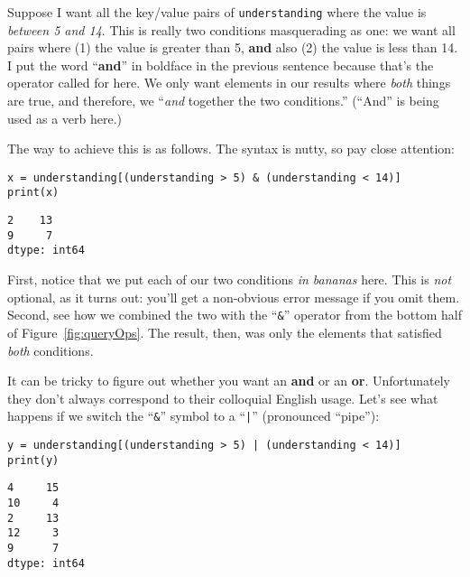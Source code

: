 
Suppose I want all the key/value pairs of \texttt{understanding} where the
value is \textit{between 5 and 14}. This is really two conditions masquerading
as one: we want all pairs where (1) the value is greater than 5, \textbf{and}
also (2) the value is less than 14. I put the word ``\textbf{and}'' in boldface
in the previous sentence because that's the operator called for here. We only
want elements in our results where \textit{both} things are true, and
therefore, we ``\textit{and} together the two conditions.'' (``And'' is being
used as a verb here.)

The way to achieve this is as follows. The syntax is nutty, so pay close
attention:

\begin{Verbatim}[fontsize=\footnotesize,samepage=true,frame=single,framesep=3mm]
x = understanding[(understanding > 5) & (understanding < 14)]
print(x)
\end{Verbatim}

\begin{Verbatim}[fontsize=\small,samepage=true,frame=leftline,framesep=5mm,framerule=1mm]
2    13
9     7
dtype: int64
\end{Verbatim}

First, notice that we put each of our two conditions \textit{in bananas} here.
This is \textit{not} optional, as it turns out: you'll get a non-obvious error
message if you omit them. Second, see how we combined the two with the
``\texttt{\&}'' operator from the bottom half of Figure~\ref{fig:queryOps}. The
result, then, was only the elements that satisfied \textit{both} conditions.


It can be tricky to figure out whether you want an \textbf{and} or an
\textbf{or}. Unfortunately they don't always correspond to their colloquial
English usage. Let's see what happens if we switch the ``\texttt{\&}'' symbol to
a ``\texttt{|}'' (pronounced ``pipe''):

\begin{Verbatim}[fontsize=\footnotesize,samepage=true,frame=single,framesep=3mm]
y = understanding[(understanding > 5) | (understanding < 14)]
print(y)
\end{Verbatim}

\begin{Verbatim}[fontsize=\small,samepage=true,frame=leftline,framesep=5mm,framerule=1mm]
4     15
10     4
2     13
12     3
9      7
dtype: int64
\end{Verbatim}

